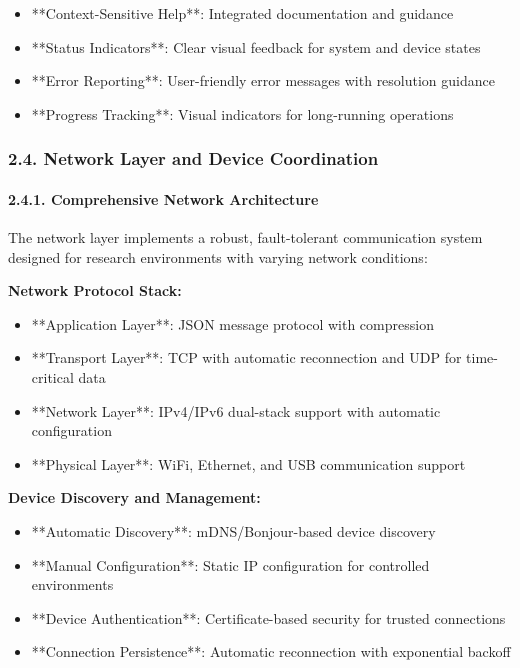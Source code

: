 \documentclass[12pt,a4paper]{article}
\begin{document}
\begin{itemize}
\item **Context-Sensitive Help**: Integrated documentation and guidance
\item **Status Indicators**: Clear visual feedback for system and device states
\item **Error Reporting**: User-friendly error messages with resolution guidance
\item **Progress Tracking**: Visual indicators for long-running operations

\end{itemize}
\subsubsection{2.4. Network Layer and Device Coordination}

\paragraph{2.4.1. Comprehensive Network Architecture}

The network layer implements a robust, fault-tolerant communication system designed for research environments with
varying network conditions:

\textbf{Network Protocol Stack:}

\begin{itemize}
\item **Application Layer**: JSON message protocol with compression
\item **Transport Layer**: TCP with automatic reconnection and UDP for time-critical data
\item **Network Layer**: IPv4/IPv6 dual-stack support with automatic configuration
\item **Physical Layer**: WiFi, Ethernet, and USB communication support

\end{itemize}
\textbf{Device Discovery and Management:}

\begin{itemize}
\item **Automatic Discovery**: mDNS/Bonjour-based device discovery
\item **Manual Configuration**: Static IP configuration for controlled environments
\item **Device Authentication**: Certificate-based security for trusted connections
\item **Connection Persistence**: Automatic reconnection with exponential backoff

\end{itemize}
\end{document}
